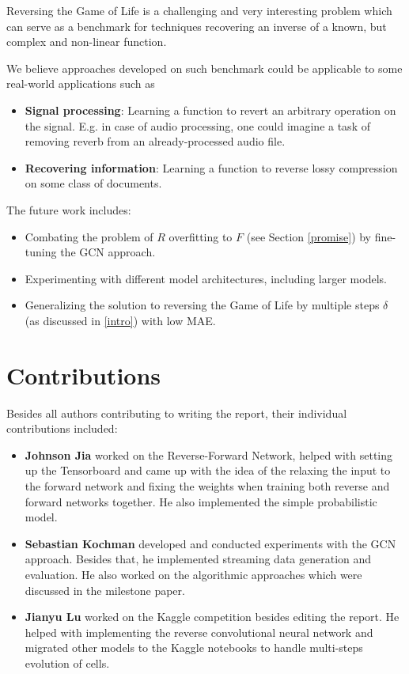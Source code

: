 \documentclass[conference]{IEEEtran}
\begin{document}
Reversing the Game of Life is a challenging and very interesting problem which can serve as a benchmark for techniques recovering an inverse of a known, but complex and non-linear function.

We believe approaches developed on such benchmark could be applicable to some real-world applications such as
\begin{itemize}
    \item \textbf{Signal processing}: Learning a function to revert an arbitrary operation on the signal. E.g. in case of audio processing, one could imagine a task of removing reverb from an already-processed audio file. 
    \item \textbf{Recovering information}: Learning a function to reverse lossy compression on some class of documents.
\end{itemize}

The future work includes:
\begin{itemize}
    \item Combating the problem of $R$ overfitting to $F$ (see Section \ref{promise}) by fine-tuning the GCN approach.
    \item Experimenting with different model architectures, including larger models.
    \item Generalizing the solution to reversing the Game of Life by multiple steps $\delta$ (as discussed in \ref{intro}) with low MAE.
\end{itemize}

\section{Contributions}
Besides all authors contributing to writing the report, their individual contributions included:

\begin{itemize}
    \item \textbf{Johnson Jia} worked on the Reverse-Forward Network, helped with setting up the Tensorboard and came up with the idea of the relaxing the input to the forward network and fixing the weights when training both reverse and forward networks together. He also implemented the simple probabilistic model.

    \item \textbf{Sebastian Kochman} developed and conducted experiments with the GCN approach. Besides that, he implemented streaming data generation and evaluation. He also worked on the algorithmic approaches which were discussed in the milestone paper.

    \item \textbf{Jianyu Lu} worked on the Kaggle competition besides editing the report. He helped with implementing the reverse convolutional neural network and migrated other models to the Kaggle notebooks to handle multi-steps evolution of cells.

\end{itemize}


%
%


\end{document}
